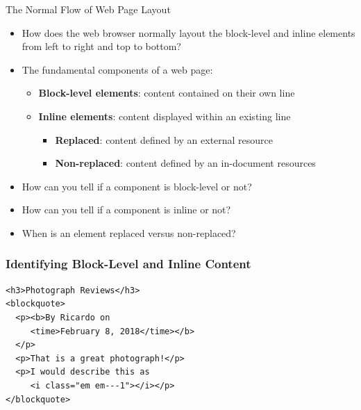 \documentclass[14pt,aspectratio=169]{beamer}
\begin{document}
%
\begin{frame}{The Normal Flow of Web Page Layout}
  \begin{itemize}
    \item How does the web browser normally layout the block-level and inline
      elements from left to right and top to bottom?
      \vspace*{-.15in}
    \item The fundamental components of a web page:
      \begin{itemize}
        \item {\bf Block-level elements}: content contained on their own line
        \item {\bf Inline elements}: content displayed within an existing line
          \begin{itemize}
            \item {\bf Replaced}: content defined by an external resource
            \item {\bf Non-replaced}: content defined by an in-document
              resources
          \end{itemize}
      \end{itemize}
      \vspace*{-.2in}
    \item How can you tell if a component is block-level or not?
      \vspace*{-.2in}
    \item How can you tell if a component is inline or not?
      \vspace*{-.2in}
    \item When is an element replaced versus non-replaced?
  \end{itemize}
\end{frame}

%
\begin{frame}[fragile]
  \frametitle{Identifying Block-Level and Inline Content}
  \normalsize
  \begin{minipage}{6in}
    \vspace*{.1in}
    \begin{verbatim}
<h3>Photograph Reviews</h3>
<blockquote>
  <p><b>By Ricardo on
     <time>February 8, 2018</time></b>
  </p>
  <p>That is a great photograph!</p>
  <p>I would describe this as
     <i class="em em---1"></i></p>
</blockquote>
    \end{verbatim}
  \end{minipage}
%
\end{frame}
\end{document}
